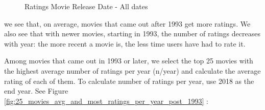\documentclass[
]{article}
\begin{document}
\begin{figure}[h!]

{\centering {}\newline{}

}

\caption{Ratings Movie Release Date - All dates\label{fig:ratings_movie_release_date_all_dates}}\label{fig:md_1}
\end{figure}

we see that, on average, movies that came out after 1993 get more
ratings. We also see that with newer movies, starting in 1993, the
number of ratings decreases with year: the more recent a movie is, the
less time users have had to rate it.

\newpage

Among movies that came out in 1993 or later, we select the top 25 movies
with the highest average number of ratings per year (n/year) and
calculate the average rating of each of them. To calculate number of
ratings per year, use 2018 as the end year. See Figure
\ref{fig:25_movies_avg_and_most_ratings_per_year_post_1993} :
\end{document}
